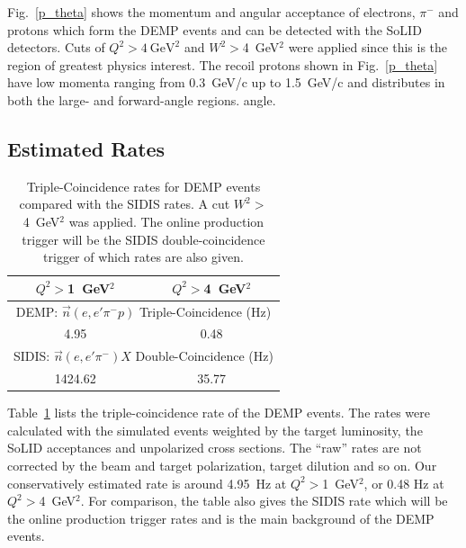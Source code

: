 Fig.~\ref{p_theta} shows the momentum and angular acceptance of electrons,
$\pi^{-}$ and protons which form the DEMP events and can be detected with the
SoLID detectors.  Cuts of $Q^{2}>4~\mathrm{GeV^{2}}$ and $W^2>$4~GeV$^2$ were
applied since this is the region of greatest physics interest.  The recoil
protons shown in Fig.~\ref{p_theta} have low momenta ranging from 0.3~GeV/c up
to 1.5~GeV/c and distributes in both the large- and forward-angle regions.
angle.

\subsection{Estimated Rates
\label{sec:rates}}

\begin{table}[!ht]
\centering
\begin{tabular}{|c|c|}
 \hline
  $Q^2>$1~GeV$^2$ & $Q^2>$4~GeV$^2$\\
 \hline
\multicolumn{2}{|c|}{DEMP: $\vec{n}(e,e'\pi^{-}p)$ Triple-Coincidence (Hz)}\\
 \hline
 4.95   &  0.48 \\
 \hline
\multicolumn{2}{|c|}{SIDIS: $\vec{n}(e,e'\pi^{-})X$ Double-Coincidence (Hz)}\\
 \hline
   1424.62  & 35.77   \\
 \hline
\end{tabular}
\caption[Triple-Coincidence rates for
  neutron-DEMP]{\footnotesize{Triple-Coincidence rates for DEMP events compared
    with the SIDIS rates. A cut $W^2>$4~GeV$^2$ was applied. The online production
    trigger will be the SIDIS double-coincidence trigger of which rates are
    also given.}}
\label{rate_table}
\end{table} 

Table~\ref{rate_table} lists the triple-coincidence rate of the DEMP
events. The rates were calculated with the simulated events weighted by the target
luminosity, the SoLID acceptances and unpolarized cross sections.  The ``raw''
rates are not corrected by the beam and target polarization, target dilution
and so on.  Our conservatively estimated rate is around 4.95~Hz at
$Q^{2}>$1~GeV$^{2}$, or 0.48 Hz at $Q^{2}>$4~GeV$^{2}$. For comparison, the
table also gives the SIDIS rate which will be the online production trigger
rates and is the main background of the DEMP events.

